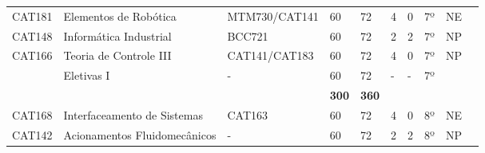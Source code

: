 \begin{table}[]
{\begin{tabular}{l|l|l|l|l|l|l|l|l|l}
			\multicolumn{1}{|l|}{CAT181}                        & Elementos de Robótica                                    & MTM730/CAT141                 & 60                                                           & 72                         & 4                        & 0                         & 7º                         & NE                      &  \\ \cline{1-9}
			\multicolumn{1}{|l|}{CAT148}                        & Informática Industrial                                   & BCC721                        & 60                                                           & 72                         & 2                        & 2                         & 7º                         & NP                      &  \\ \cline{1-9}
			\multicolumn{1}{|l|}{CAT166}                        & Teoria de Controle III                                   & CAT141/CAT183                 & 60                                                           & 72                         & 4                        & 0                         & 7º                         & NP                      &  \\ \cline{1-9}
			\multicolumn{1}{|l|}{{\color[HTML]{009901} }}       & {\color[HTML]{009901} Eletivas I}                        & {\color[HTML]{009901} -}      & {\color[HTML]{009901} 60}                                    & {\color[HTML]{009901} 72}  & {\color[HTML]{009901} -} & {\color[HTML]{009901} -}  & {\color[HTML]{009901} 7º}  & {\color[HTML]{009901} } &  \\ \cline{1-9}
			\multicolumn{1}{|l|}{}                              &                                                          &                               & \textbf{300}                                                 & \textbf{360}               &                          &                           &                            &                         &  \\ \cline{1-9}
			CAT168                                              & Interfaceamento de Sistemas                              & CAT163                        & 60                                                           & 72                         & 4                        & 0                         & 8º                         & NE                      &  \\ \cline{1-9}
			\multicolumn{1}{|l|}{CAT142}                        & Acionamentos Fluidomecânicos                             & -                             & 60                                                           & 72                         & 2                        & 2                         & 8º                         & NP                      &  \\ \cline{1-9}

\end{tabular}}
\end{table}
